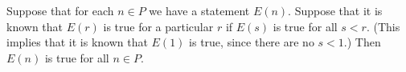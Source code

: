 Suppose that for each $n \in P$ we have a statement $E(n)$. Suppose that it is known that $E(r)$ is true for a particular $r$ if $E(s)$ is true for all $s < r$. (This implies that it is known that $E(1)$ is true, since there are no $s < 1$.) Then $E(n)$ is true for all $n \in P$.
